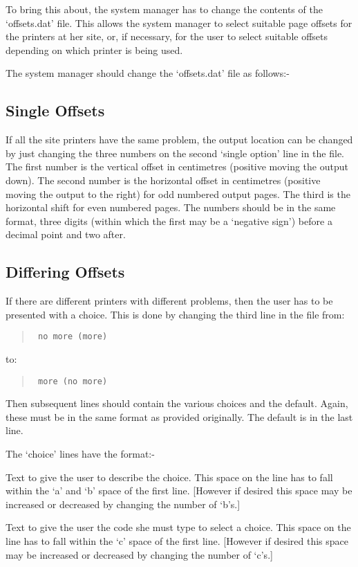 To bring this about, the system manager has to change the contents of the
`offsets.dat' file. This allows the system manager to select suitable page
offsets for the printers at her site, or, if necessary, for the user to
select suitable offsets depending on which printer is being used. 

The system manager should change the `offsets.dat' file as follows:- 

\subsection{Single Offsets}

If all the site printers have the same problem, the output location can be
changed by just changing the three numbers on the second `single option'
line in the file. The first number is the vertical offset in centimetres
(positive moving the output down). The second number is the horizontal
offset in centimetres (positive moving the output to the right) for odd
numbered output pages. The third is the horizontal shift for even numbered
pages. The numbers should be in the same format, three digits (within which
the first may be a `negative sign') before a decimal point and two after. 

\subsection{Differing Offsets}

If there are different printers with different problems, then the user has
to be presented with a choice. This is done by changing the third line in
the file from: 

\begin{quote}\tt
no more     (more)
\end{quote}
to:
\begin{quote}\tt
more     (no more)
\end{quote}

Then subsequent lines should contain the various choices and the default.
Again, these must be in the same format as provided originally. The default
is in the last line. 

The `choice' lines have the format:- 

Text to give the user to describe the choice. This space on the line has to
fall within the `a' and `b' space of the first line. [However if desired
this space may be increased or decreased by changing the number of `b's.] 

Text to give the user the code she must type to select a choice. This space
on the line has to fall within the `c' space of the first line. [However if
desired this space may be increased or decreased by changing the number of
`c's.] 

